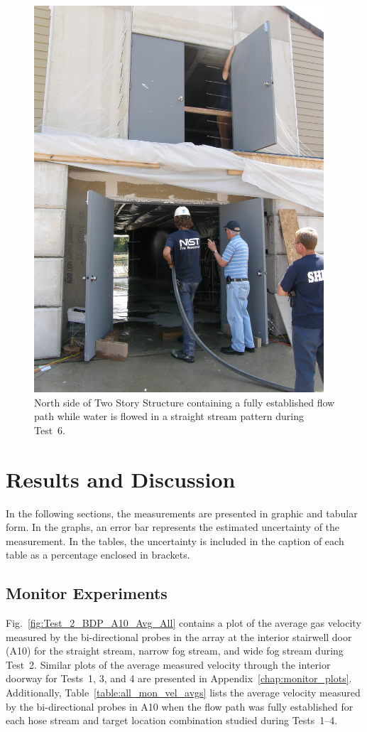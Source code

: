 \documentclass[12pt,oneside]{book}
\begin{document}
\begin{figure}[!ht]
	\includegraphics[width=4.25in]{../Figures/Pictures/Test_18}
	\caption[North side of Two Story Structure containing a fully established flow path during Test~6.]{North side of Two Story Structure containing a fully established flow path while water is flowed in a straight stream pattern during Test~6.}
	\label{fig:test_6_pic}
\end{figure}
\FloatBarrier

\chapter{Results and Discussion}
\label{chap:results}
In the following sections, the measurements are presented in graphic and tabular form. In the graphs, an error bar represents the estimated uncertainty of the measurement. In the tables, the uncertainty is included in the caption of each table as a percentage enclosed in brackets.

\section{Monitor Experiments}
\label{sec:monitor_results}
Fig.~\ref{fig:Test_2_BDP_A10_Avg_All} contains a plot of the average gas velocity measured by the bi-directional probes in the array at the interior stairwell door (A10) for the straight stream, narrow fog stream, and wide fog stream during Test~2. Similar plots of the average measured velocity through the interior doorway for Tests~1, 3, and 4 are presented in Appendix~\ref{chap:monitor_plots}. Additionally, Table~\ref{table:all_mon_vel_avgs} lists the average velocity measured by the bi-directional probes in A10 when the flow path was fully established for each hose stream and target location combination studied during Tests~1--4.
\end{document}
